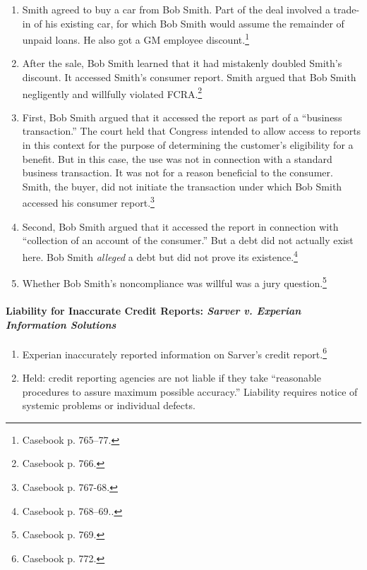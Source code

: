 \begin{enumerate}
    \item Smith agreed to buy a car from Bob Smith. Part of the deal involved a 
    trade-in of his existing car, for which Bob Smith would assume the remainder 
    of unpaid loans. He also got a GM employee discount.\footnote{Casebook p. 
    765--77.}
    \item After the sale, Bob Smith learned that it had mistakenly doubled 
    Smith's discount. It accessed Smith's consumer report. Smith argued that Bob 
    Smith negligently and willfully violated FCRA.\footnote{Casebook p. 766.}
    \item First, Bob Smith argued that it accessed the report as part of a 
    ``business transaction.'' The court held that Congress intended to allow 
    access to reports in this context for the purpose of determining the 
    customer's eligibility for a benefit. But in this case, the use was not in 
    connection with a standard business transaction. It was not for a reason 
    beneficial to the consumer. Smith, the buyer, did not initiate the 
    transaction under which Bob Smith accessed his consumer 
    report.\footnote{Casebook p. 767-68.}
    \item Second, Bob Smith argued that it accessed the report in connection 
    with ``collection of an account of the consumer.'' But a debt did not 
    actually exist here. Bob Smith \emph{alleged} a debt but did not prove its 
    existence.\footnote{Casebook p. 768--69..}
    \item Whether Bob Smith's noncompliance was willful was a jury 
    question.\footnote{Casebook p. 769.}
\end{enumerate}

\paragraph{Liability for Inaccurate Credit Reports: \emph{Sarver v. Experian 
Information Solutions}}

\begin{enumerate}
    \item Experian inaccurately reported information on Sarver's credit 
    report.\footnote{Casebook p. 772.}
    \item Held: credit reporting agencies are not liable if they take 
    ``reasonable procedures to assure maximum possible accuracy.'' Liability 
    requires notice of systemic problems or individual defects.
\end{enumerate}

